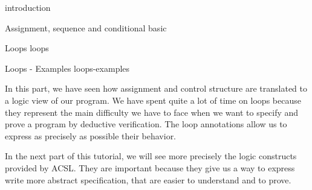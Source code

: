 \begin{levelTwo}
  {}
  {introduction}
\end{levelTwo}

\begin{levelTwo}
  {Assignment, sequence and conditional}
  {basic}
\end{levelTwo}

\begin{levelTwo}
  {Loops}
  {loops}
\end{levelTwo}

\begin{levelTwo}
  {Loops - Examples}
  {loops-examples}
\end{levelTwo}


\horizontalLine



In this part, we have seen how assignment and control structure are translated
to a logic view of our program. We have spent quite a lot of time on loops
because they represent the main difficulty we have to face when we want to
specify and prove a program by deductive verification. The loop annotations
allow us to express as precisely as possible their behavior.



In the next part of this tutorial, we will see more precisely the logic
constructs provided by ACSL. They are important because they give us a way to
express write more abstract specification, that are easier to understand and
to prove.
